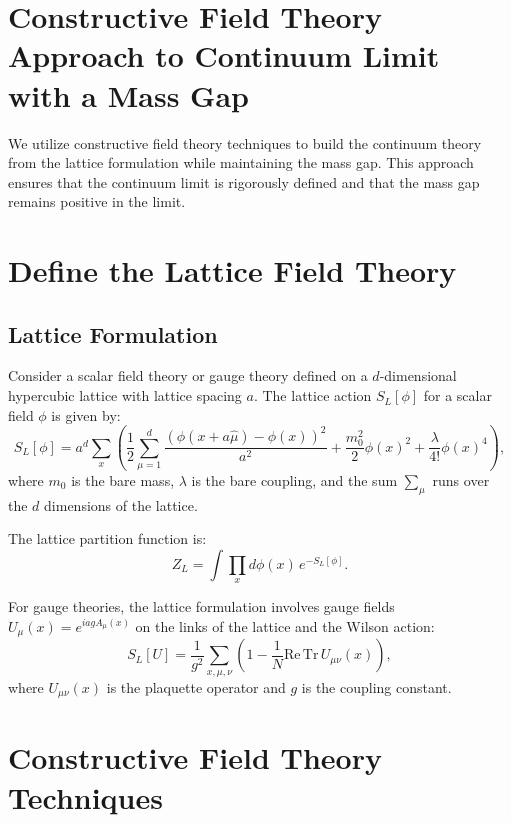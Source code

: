 \section{Constructive Field Theory Approach to Continuum Limit with a Mass Gap}

We utilize constructive field theory techniques to build the continuum theory 
from the lattice formulation while maintaining the mass gap. This approach ensures 
that the continuum limit is rigorously defined and that the mass gap remains 
positive in the limit.



\section{Define the Lattice Field Theory}

\subsection{Lattice Formulation}

Consider a scalar field theory or gauge theory defined on a \(d\)-dimensional hypercubic lattice with lattice spacing \(a\). The lattice action \(S_L[\phi]\) for a scalar field \(\phi\) is given by:
\begin{equation}
S_L[\phi] = a^d \sum_x \left( \frac{1}{2} \sum_{\mu=1}^d \frac{(\phi(x + a\hat{\mu}) - \phi(x))^2}{a^2} + \frac{m_0^2}{2} \phi(x)^2 + \frac{\lambda}{4!} \phi(x)^4 \right),
\end{equation}
where \(m_0\) is the bare mass, \(\lambda\) is the bare coupling, and the sum \(\sum_\mu\) runs over the \(d\) dimensions of the lattice.

The lattice partition function is:
\begin{equation}
Z_L = \int \prod_x d\phi(x) \, e^{-S_L[\phi]}.
\end{equation}

For gauge theories, the lattice formulation involves gauge fields \(U_\mu(x) = e^{i a g A_\mu(x)}\) on the links of the lattice and the Wilson action:
\begin{equation}
S_L[U] = \frac{1}{g^2} \sum_{x,\mu,\nu} \left( 1 - \frac{1}{N} \text{Re} \, \text{Tr} \, U_{\mu\nu}(x) \right),
\end{equation}
where \(U_{\mu\nu}(x)\) is the plaquette operator and \(g\) is the coupling constant.



\section{Constructive Field Theory Techniques}

